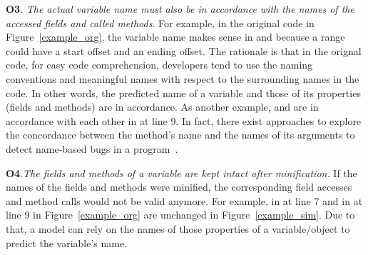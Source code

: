 \textbf{O3}. {\em The actual variable name must also be in accordance
  with the names of the accessed fields and called methods}. For
example, in the original code in Figure~\ref{example_org}, the
variable name  makes sense in  and
 because a range could have a start offset and
an ending offset. The rationale is that in the orignal code, for easy
code comprehension, developers tend to use the naming conventions and
meaningful names with respect to the surrounding names in the code. In
other words, the predicted name of a variable and those of its
properties (fields and methods) are in accordance. As another example,
 and  are in accordance with each
other in  at line 9. In fact, there exist
approaches to explore the concordance between the method's name and
the names of its arguments to detect name-based bugs in a
program~\cite{deepbugs-oopsla18}.

\textbf{O4}.{\em The fields and methods of a variable are kept intact
  after minification.} If the names of the fields and methods were
minified, the corresponding field accesses and method calls would not
be valid anymore. For example,  in
 at line 7 and  in
 at line 9 in Figure~\ref{example_org} are
unchanged in Figure~\ref{example_sim}. Due to that, a model can rely
on the names of those properties of a variable/object to predict the
variable's name.















